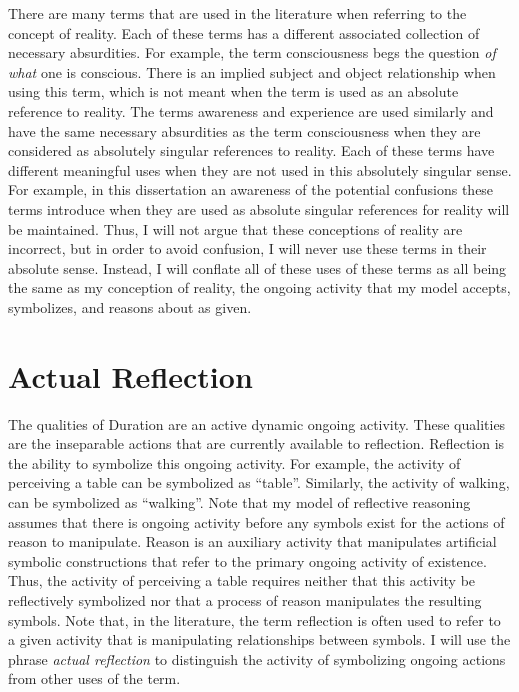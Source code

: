 There are many terms that are used in the literature when referring to
the concept of reality.  Each of these terms has a different
associated collection of necessary absurdities.  For example, the term
consciousness begs the question \emph{of what} one is conscious.
There is an implied subject and object relationship when using this
term, which is not meant when the term is used as an absolute
reference to reality.  The terms awareness and experience are used
similarly and have the same necessary absurdities as the term
consciousness when they are considered as absolutely singular
references to reality.  Each of these terms have different meaningful
uses when they are not used in this absolutely singular sense.  For
example, in this dissertation an awareness of the potential confusions
these terms introduce when they are used as absolute singular
references for reality will be maintained.  Thus, I will not argue
that these conceptions of reality are incorrect, but in order to avoid
confusion, I will never use these terms in their absolute sense.
Instead, I will conflate all of these uses of these terms as all being
the same as my conception of reality, the ongoing activity that my
model accepts, symbolizes, and reasons about as given.

\section{Actual Reflection}

The qualities of Duration are an active dynamic ongoing activity.
These qualities are the inseparable actions that are currently
available to reflection.  Reflection is the ability to symbolize this
ongoing activity.  For example, the activity of perceiving a table can
be symbolized as ``table''.  Similarly, the activity of walking, can
be symbolized as ``walking''.  Note that my model of reflective
reasoning assumes that there is ongoing activity before any symbols
exist for the actions of reason to manipulate.  Reason is an auxiliary
activity that manipulates artificial symbolic constructions that refer
to the primary ongoing activity of existence.  Thus, the activity of
perceiving a table requires neither that this activity be reflectively
symbolized nor that a process of reason manipulates the resulting
symbols.  Note that, in the literature, the term reflection is often
used to refer to a given activity that is manipulating relationships
between symbols.  I will use the phrase \emph{actual reflection} to
distinguish the activity of symbolizing ongoing actions from other
uses of the term.

